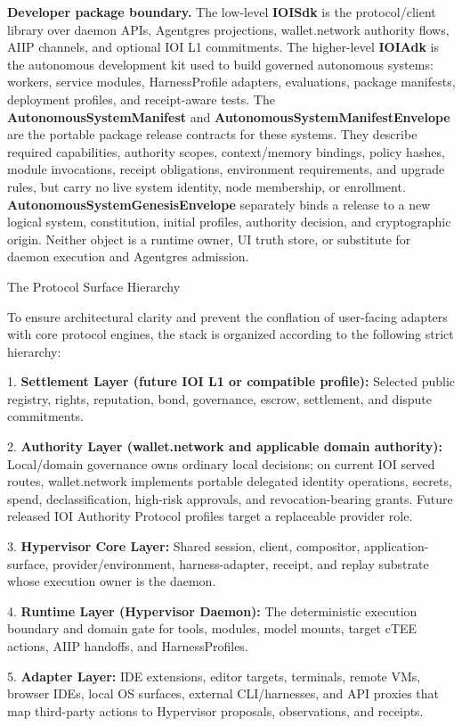 \documentclass[
  11pt,
]{article}
\begin{document}
\textbf{Developer package boundary.} The low-level \textbf{IOISdk} is
the protocol/client library over daemon APIs, Agentgres projections,
wallet.network authority flows, AIIP channels, and optional IOI L1
commitments. The higher-level \textbf{IOIAdk} is the autonomous
development kit used to build governed autonomous systems: workers,
service modules, HarnessProfile adapters, evaluations, package
manifests, deployment profiles, and receipt-aware tests. The
\textbf{AutonomousSystemManifest} and
\textbf{AutonomousSystemManifestEnvelope} are the portable package
release contracts for these systems. They describe required capabilities,
authority scopes, context/memory bindings, policy hashes, module
invocations, receipt obligations, environment requirements, and upgrade
rules, but carry no live system identity, node membership, or enrollment.
\textbf{AutonomousSystemGenesisEnvelope} separately binds a release to a new
logical system, constitution, initial profiles, authority decision, and
cryptographic origin. Neither object is a runtime owner, UI truth store, or
substitute for daemon execution and Agentgres admission.

The Protocol Surface Hierarchy

To ensure architectural clarity and prevent the conflation of
user-facing adapters with core protocol engines, the stack is organized
according to the following strict hierarchy:

1. \textbf{Settlement Layer (future IOI L1 or compatible profile):}
Selected public registry, rights, reputation, bond, governance, escrow,
settlement, and dispute commitments.

2. \textbf{Authority Layer (wallet.network and applicable domain authority):}
Local/domain governance owns ordinary local decisions; on current IOI served
routes, wallet.network implements portable delegated identity operations,
secrets, spend, declassification, high-risk approvals, and revocation-bearing
grants. Future released IOI Authority Protocol profiles target a replaceable
provider role.

3. \textbf{Hypervisor Core Layer:} Shared session, client, compositor,
application-surface, provider/environment, harness-adapter, receipt, and
replay substrate whose execution owner is the daemon.

4. \textbf{Runtime Layer (Hypervisor Daemon):} The deterministic
execution boundary and domain gate for tools, modules, model mounts, target
cTEE actions, AIIP handoffs, and HarnessProfiles.

5. \textbf{Adapter Layer:} IDE extensions, editor targets, terminals,
remote VMs, browser IDEs, local OS surfaces, external CLI/harnesses, and
API proxies that map third-party actions to Hypervisor proposals,
observations, and receipts.
\end{document}
